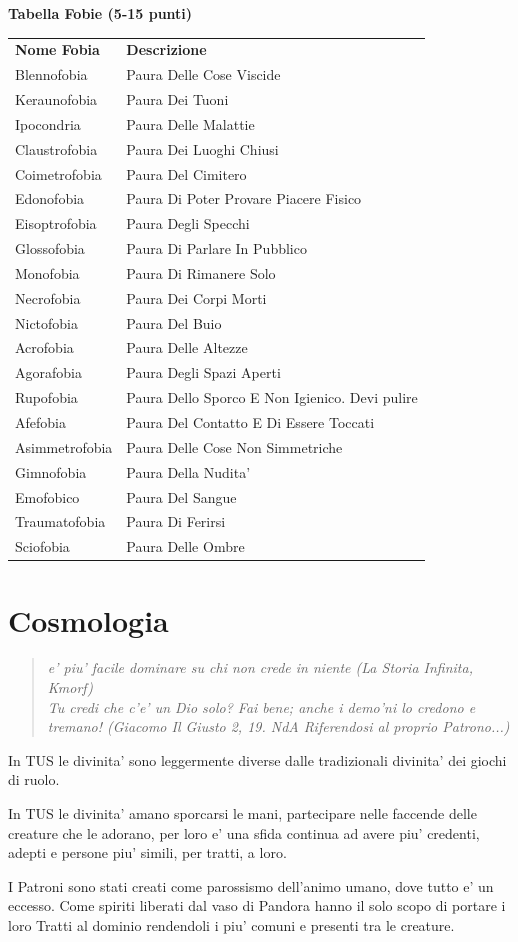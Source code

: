 \documentclass[a4paper,11pt,twoside,openany]{book}
\begin{document}
{\textbf{Tabella Fobie (5-15 punti)}

\begin{tabular}{L{3cm} L{13cm}}
\toprule
\textbf{Nome Fobia} & \textbf{Descrizione}\tabularnewline
Blennofobia & Paura Delle Cose Viscide\tabularnewline
Keraunofobia & Paura Dei Tuoni\tabularnewline
Ipocondria & Paura Delle Malattie\tabularnewline
Claustrofobia & Paura Dei Luoghi Chiusi\tabularnewline
Coimetrofobia & Paura Del Cimitero\tabularnewline
Edonofobia & Paura Di Poter Provare Piacere Fisico\tabularnewline
Eisoptrofobia & Paura Degli Specchi\tabularnewline
Glossofobia & Paura Di Parlare In Pubblico\tabularnewline
Monofobia & Paura Di Rimanere Solo\tabularnewline
Necrofobia & Paura Dei Corpi Morti\tabularnewline
Nictofobia & Paura Del Buio\tabularnewline
Acrofobia & Paura Delle Altezze\tabularnewline
Agorafobia & Paura Degli Spazi Aperti\tabularnewline
Rupofobia & Paura Dello Sporco E Non Igienico. Devi pulire\tabularnewline
Afefobia & Paura Del Contatto E Di Essere Toccati\tabularnewline
Asimmetrofobia & Paura Delle Cose Non Simmetriche\tabularnewline
Gimnofobia & Paura Della Nudita'\tabularnewline
Emofobico & Paura Del Sangue\tabularnewline
Traumatofobia & Paura Di Ferirsi\tabularnewline
Sciofobia & Paura Delle Ombre\tabularnewline
\end{tabular}

\pagebreak

\section{Cosmologia}

\label{cosmologia}
\begin{quote}\textit{
e' piu' facile dominare su chi non crede in niente (La Storia Infinita, Kmorf)\\
Tu credi che c'e' un Dio solo? Fai bene; anche i demo'ni lo credono e tremano! (Giacomo Il Giusto 2, 19. NdA Riferendosi al proprio Patrono...)
}\end{quote}

In TUS le divinita' sono leggermente diverse dalle tradizionali divinita' dei giochi di ruolo.

In TUS le divinita' amano sporcarsi le mani, partecipare nelle faccende delle creature che le adorano, per loro e' una sfida continua ad avere piu' credenti, adepti e persone piu' simili, per tratti, a loro.

I Patroni sono stati creati come parossismo dell'animo umano, dove tutto e' un eccesso. Come spiriti liberati dal vaso di Pandora hanno il solo scopo di portare i loro Tratti al dominio rendendoli i piu' comuni e presenti tra le creature.

}
\end{document}
